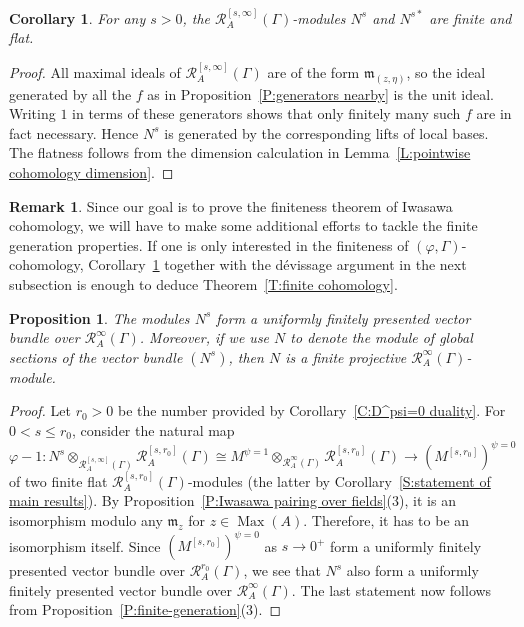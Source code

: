 \documentclass[12pt]{article}
\newtheorem{cor}[theorem]{Corollary}
\newtheorem{prop}[theorem]{Proposition}
\theoremstyle{definition}
\newtheorem{remark}[theorem]{Remark}
\numberwithin{equation}{theorem}
\newcommand{\calR}{\mathcal{R}}
\newcommand{\gothm}{\mathfrak{m}}
\DeclareMathOperator{\Max}{Max}
\begin{document}
\begin{cor}
\label{C:N_s finite flat}
For any $s >0$, the $\calR_A^{[s,\infty]}(\Gamma)$-modules $N^s$ and $N^{s*}$ are finite and flat.
\end{cor}
\begin{proof}
All maximal ideals of $\calR_A^{[s,\infty]}(\Gamma)$ are of the form
$\gothm_{(z,\eta)}$, so the ideal generated by all the $f$ as in
Proposition~\ref{P:generators nearby} is the unit ideal.  Writing $1$
in terms of these generators shows that only finitely many such $f$
are in fact necessary.  Hence $N^s$ is generated by the corresponding
lifts of local bases.  The flatness follows from the dimension
calculation in Lemma~\ref{L:pointwise cohomology dimension}.
\end{proof}


\begin{remark}
Since our goal is to prove the finiteness theorem of Iwasawa cohomology, we will have to make some additional efforts to tackle the finite generation properties.  If one is only interested in the finiteness of $(\varphi,\Gamma)$-cohomology, Corollary~\ref{C:N_s finite flat} together with the d\'evissage argument in the next subsection is enough to deduce Theorem~\ref{T:finite cohomology}. 
\end{remark}

\begin{prop}
\label{P:N^s uniformly fp}
The modules $N^s$ form a uniformly finitely presented vector bundle over $\calR_A^\infty(\Gamma)$.  Moreover, if we use $N$ to denote  the module of global sections of the vector bundle $(N^s)$, then $N$ is a finite projective $\calR_A^\infty(\Gamma)$-module.
\end{prop}
\begin{proof}
Let $r_0>0$ be the number provided by Corollary~\ref{C:D^psi=0 duality}. 
For $0<s\leq r_0$, consider the natural map
\[
\varphi-1: N^s \otimes_{\calR_A^{[s, \infty]}(\Gamma)}\calR_A^{[s,r_0]}(\Gamma) \cong M^{\psi=1} \otimes_{\calR_A^\infty(\Gamma)}
\calR_A^{[s,r_0]}(\Gamma) \to (M^{[s,r_0]})^{\psi=0}
\]
of two finite flat $\calR_A^{[s,r_0]}(\Gamma)$-modules (the latter by Corollary~\ref{S:statement of main results}).  By Proposition~\ref{P:Iwasawa pairing over fields}(3), it is an isomorphism modulo any $\gothm_z$ for $z \in \Max(A)$.  Therefore, it has to be an isomorphism itself.  Since $(M^{[s,r_0]})^{\psi=0}$ as $s\to0^+$ form a uniformly  finitely presented vector bundle over $\calR_A^{r_0}(\Gamma)$, we see that $N^s$ also form a uniformly  finitely presented vector bundle over $\calR_A^\infty(\Gamma)$.
The last statement now follows from Proposition~\ref{P:finite-generation}(3).
\end{proof}
\end{document}
